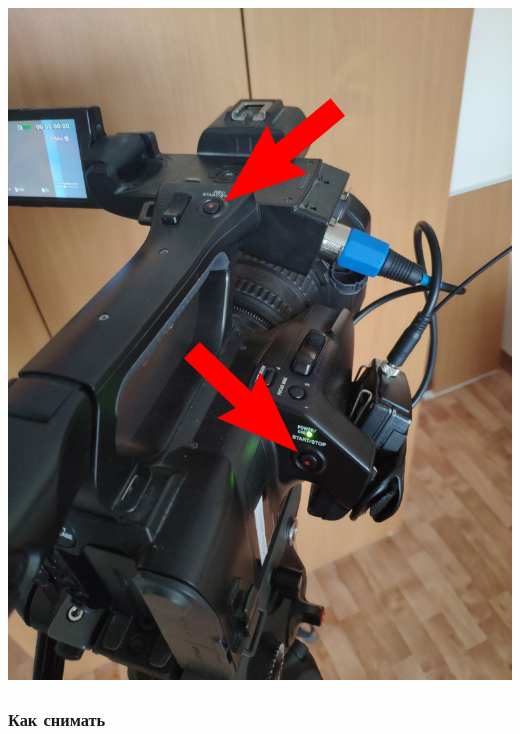 \begin{enumerate}
\begin{enumerate}
                \begin{center}
                  \begin{minipage}[c]{0.45\textwidth}
                    \includegraphics[width=\textwidth]{Images/PortableCamera/recording/step10.7-start-recording.jpg}
                  \end{minipage}
                \end{center}

        \end{enumerate}
\end{enumerate}

\subsubsection{Как снимать}

